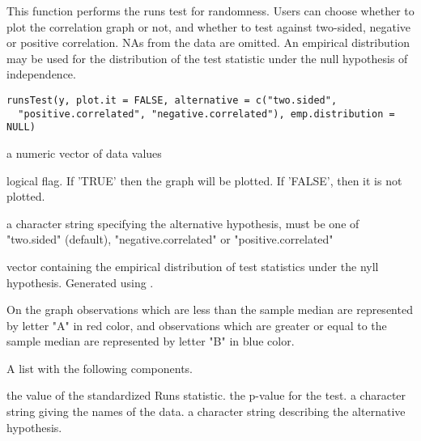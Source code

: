 \documentclass[a4paper]{book}
\begin{document}
%
\begin{Description}\relax
This function performs the runs test for randomness. Users can choose whether to plot the correlation graph or not, and whether to test against two-sided, negative or positive correlation. NAs from the data are omitted. An empirical distribution may be used for the distribution of the test statistic under the null hypothesis of independence.
\end{Description}
%
\begin{Usage}
\begin{verbatim}
runsTest(y, plot.it = FALSE, alternative = c("two.sided",
  "positive.correlated", "negative.correlated"), emp.distribution = NULL)
\end{verbatim}
\end{Usage}
%
\begin{Arguments}
\begin{ldescription}
\item[\code{y}] a numeric vector of data values

\item[\code{plot.it}] logical flag.  If 'TRUE' then the graph will be plotted. If 'FALSE', then it is not plotted.

\item[\code{alternative}] a character string specifying the alternative hypothesis, must be one of "two.sided" (default), "negative.correlated" or "positive.correlated"

\item[\code{emp.distribution}] vector containing the empirical distribution of test statistics under the nyll hypothesis. Generated using .
\end{ldescription}
\end{Arguments}
%
\begin{Details}\relax
On the graph observations which are less than the sample median are represented by letter "A" in red color, and observations which are greater or equal to the sample median are represented by letter "B" in blue color.
\end{Details}
%
\begin{Value}
A list with the following components.

	the value of the standardized Runs statistic.
 the p-value for the test.
 a character string giving the names of the data.
 a character string describing the alternative hypothesis.
\end{Value}
\end{document}
